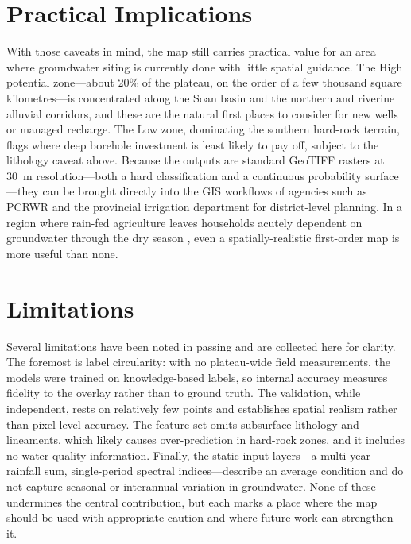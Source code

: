 \section{Practical Implications}
\label{sec:discuss_implications}

With those caveats in mind, the map still carries practical value for an area
where groundwater siting is currently done with little spatial guidance. The High
potential zone---about 20\% of the plateau, on the order of a few thousand square
kilometres---is concentrated along the Soan basin and the northern and riverine
alluvial corridors, and these are the natural first places to consider for new
wells or managed recharge. The Low zone, dominating the southern hard-rock
terrain, flags where deep borehole investment is least likely to pay off, subject
to the lithology caveat above. Because the outputs are standard GeoTIFF rasters at
30~m resolution---both a hard classification and a continuous probability
surface---they can be brought directly into the GIS workflows of agencies such as
PCRWR and the provincial irrigation department for district-level planning. In a
region where rain-fed agriculture leaves households acutely dependent on
groundwater through the dry season \cite{sarwar2022soandrought}, even a
spatially-realistic first-order map is more useful than none.

\section{Limitations}
\label{sec:discuss_limitations}

Several limitations have been noted in passing and are collected here for clarity.
The foremost is label circularity: with no plateau-wide field measurements, the
models were trained on knowledge-based labels, so internal accuracy measures
fidelity to the overlay rather than to ground truth. The validation, while
independent, rests on relatively few points and establishes spatial realism rather
than pixel-level accuracy. The feature set omits subsurface lithology and
lineaments, which likely causes over-prediction in hard-rock zones, and it
includes no water-quality information. Finally, the static input layers---a
multi-year rainfall sum, single-period spectral indices---describe an average
condition and do not capture seasonal or interannual variation in groundwater.
None of these undermines the central contribution, but each marks a place where
the map should be used with appropriate caution and where future work can
strengthen it.
